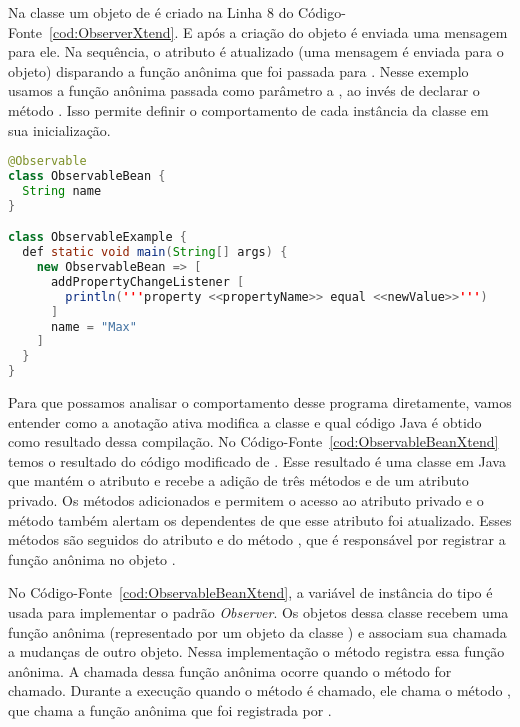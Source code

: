 Na classe  um objeto de  é criado na Linha 8 do Código-Fonte~\ref{cod:ObserverXtend}. E após a criação do objeto é enviada uma mensagem  para ele. Na sequência, o atributo  é atualizado (uma mensagem  é enviada para o objeto) disparando a função anônima que foi passada para . Nesse exemplo usamos a função anônima passada como parâmetro a , ao invés de declarar o método . Isso permite definir o comportamento de cada instância da classe  em sua inicialização.

\begin{lstlisting}[language=Java, caption={Exemplo de uso em Xtend}, label={cod:ObserverXtend}]
@Observable
class ObservableBean {
  String name
}

class ObservableExample {
  def static void main(String[] args) {
    new ObservableBean => [
      addPropertyChangeListener [
        println('''property <<propertyName>> equal <<newValue>>''')
      ]
      name = "Max"
    ]
  }
}
\end{lstlisting}

Para que possamos analisar o comportamento desse programa diretamente, vamos entender como a anotação ativa  modifica a classe  e qual código Java é obtido como resultado dessa compilação. No Código-Fonte~\ref{cod:ObservableBeanXtend} temos o resultado do código modificado de . Esse resultado é uma classe em Java que mantém o atributo  e recebe a adição de três métodos e de um atributo privado. Os métodos adicionados  e  permitem o acesso ao atributo privado  e o método  também alertam os dependentes de que esse atributo foi atualizado. Esses métodos são seguidos do atributo  e do método , que é responsável por registrar a função anônima no objeto .

No Código-Fonte~\ref{cod:ObservableBeanXtend}, a variável de instância do tipo  é usada para implementar o padrão \textit{Observer}. Os objetos dessa classe recebem uma função anônima (representado por um objeto da classe ) e associam sua chamada a mudanças de outro objeto. Nessa implementação o método  registra essa função anônima. A chamada dessa função anônima ocorre quando o método  for chamado. Durante a execução quando o método  é chamado, ele chama o método , que chama a função anônima que foi registrada por . 

